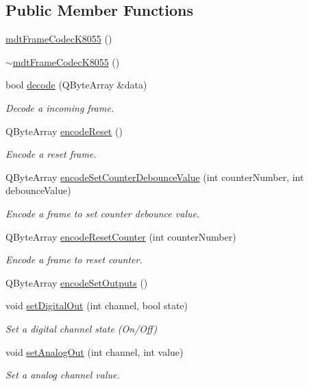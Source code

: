 \subsection*{Public Member Functions}
\begin{DoxyCompactItemize}
\item 
\hyperlink{classmdt_frame_codec_k8055_ac3b129a56194276b782f77b0cf22c469}{mdt\-Frame\-Codec\-K8055} ()
\item 
\hyperlink{classmdt_frame_codec_k8055_a5464455051c6928bdbf46ebb796e7a86}{$\sim$mdt\-Frame\-Codec\-K8055} ()
\item 
bool \hyperlink{classmdt_frame_codec_k8055_a9dfe60529b0e80d5bbd3852fdea51b18}{decode} (Q\-Byte\-Array \&data)
\begin{DoxyCompactList}\small\item\em Decode a incoming frame. \end{DoxyCompactList}\item 
Q\-Byte\-Array \hyperlink{classmdt_frame_codec_k8055_ab2dbd6a524f0523902f95db665ff486b}{encode\-Reset} ()
\begin{DoxyCompactList}\small\item\em Encode a reset frame. \end{DoxyCompactList}\item 
Q\-Byte\-Array \hyperlink{classmdt_frame_codec_k8055_aa88f104ba85532c17eaf3c2dbacb8530}{encode\-Set\-Counter\-Debounce\-Value} (int counter\-Number, int debounce\-Value)
\begin{DoxyCompactList}\small\item\em Encode a frame to set counter debounce value. \end{DoxyCompactList}\item 
Q\-Byte\-Array \hyperlink{classmdt_frame_codec_k8055_a99fd4cc7eaed0c7d83c4f66a8ecd6268}{encode\-Reset\-Counter} (int counter\-Number)
\begin{DoxyCompactList}\small\item\em Encode a frame to reset counter. \end{DoxyCompactList}\item 
Q\-Byte\-Array \hyperlink{classmdt_frame_codec_k8055_aae8b095b69addd5e4c501ba3d7fe0fe0}{encode\-Set\-Outputs} ()
\item 
void \hyperlink{classmdt_frame_codec_k8055_a81e04679d7eca9771c7516f052490942}{set\-Digital\-Out} (int channel, bool state)
\begin{DoxyCompactList}\small\item\em Set a digital channel state (On/\-Off) \end{DoxyCompactList}\item 
void \hyperlink{classmdt_frame_codec_k8055_a3cecf2bec01386ebf9f1d99b738118e1}{set\-Analog\-Out} (int channel, int value)
\begin{DoxyCompactList}\small\item\em Set a analog channel value. \end{DoxyCompactList}\end{DoxyCompactItemize}
